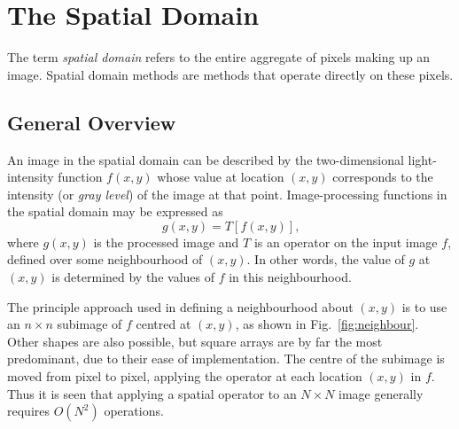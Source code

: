 
\section{The Spatial Domain}
\label{image:spatial}

The term {\em spatial domain\/} refers to the entire aggregate of
pixels making up an image.  Spatial domain methods are methods that
operate directly on these pixels.

\subsection{General Overview}
\label{image:spatial:overview}

An image in the spatial domain can be described by the two-dimensional
light-intensity function $f(x,y)$ whose value at location $(x,y)$
corresponds to the intensity (or {\em gray level\/}) of the image at
that point.  Image-processing functions in the spatial domain may be
expressed as
\begin{equation}
\label{eq:spatial_operator}
g(x,y)=T[f(x,y)]\mbox{,}
\end{equation}
where $g(x,y)$ is the processed image and $T$ is an operator on the
input image $f$, defined over some neighbourhood of $(x,y)$.  In other
words, the value of $g$ at $(x,y)$ is determined by the values of $f$
in this neighbourhood.


The principle approach used in defining a neighbourhood about $(x,y)$
is to use an $n\times n$ subimage of $f$ centred at $(x,y)$, as shown
in Fig.~\ref{fig:neighbour}.  Other shapes are also possible, but
square arrays are by far the most predominant, due to their ease of
implementation.  The centre of the subimage is moved from pixel to
pixel, applying the operator at each location $(x,y)$ in $f$.  Thus it
is seen that applying a spatial operator to an $N\times N$ image
generally requires $O(N^{2})$ operations.

